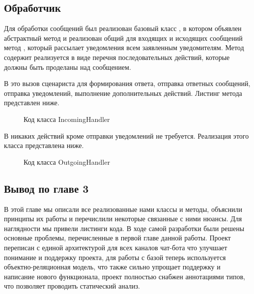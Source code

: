     \subsection{Обработчик}
    Для обработки сообщений был реализован базовый класс , в котором объявлен
    абстрактный метод  и реализован общий для входящих и исходящих сообщений
    метод , который рассылает уведомления всем заявленным уведомителям.
    Метод  содержит реализуется в виде перечня последовательных действий,
    которые должны быть проделаны над сообщением.

    В  это вызов сценариста для формирования ответа, отправка ответных сообщений,
    отправка уведомлений, выполнение дополнительных действий. Листинг метода представлен ниже.

    \begin{figure}[H]
        \centering
        
        \caption{Код класса IncomingHandler}
        \label{fig:incomig_handler_handle}
    \end{figure}

    В  никаких действий кроме отправки уведомлений не требуется.
    Реализация этого класса представлена ниже.

    \begin{figure}[H]
        \centering
        
        \caption{Код класса OutgoingHandler}
        \label{fig:outgoing_handler}
    \end{figure}

    \subsection*{Вывод по главе 3}
    В этой главе мы описали все реализованные нами классы и методы, объяснили принципы
    их работы и перечислили некоторые связанные с ними нюансы.
    Для наглядности мы привели листинги кода.
    В ходе самой разработки были решены основные проблемы, перечисленные в первой главе данной работы.
    Проект переписан с единой архитектурой для всех каналов чат-бота что улучшает понимание и поддержку
    проекта, для работы с базой теперь используется объектно-реляционная модель, что также сильно
    упрощает поддержку и написание нового функционала,
    проект полностью снабжен аннотациями типов, что позволяет проводить статический анализ.
